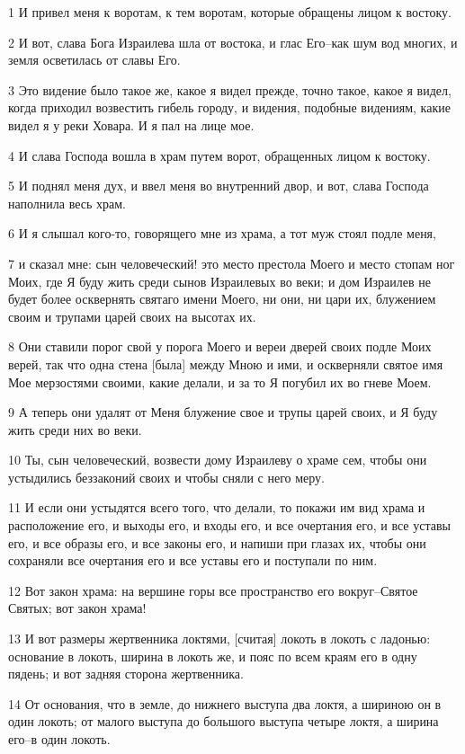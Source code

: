 \par 1 И привел меня к воротам, к тем воротам, которые обращены лицом к востоку.
\par 2 И вот, слава Бога Израилева шла от востока, и глас Его--как шум вод многих, и земля осветилась от славы Его.
\par 3 Это видение было такое же, какое я видел прежде, точно такое, какое я видел, когда приходил возвестить гибель городу, и видения, подобные видениям, какие видел я у реки Ховара. И я пал на лице мое.
\par 4 И слава Господа вошла в храм путем ворот, обращенных лицом к востоку.
\par 5 И поднял меня дух, и ввел меня во внутренний двор, и вот, слава Господа наполнила весь храм.
\par 6 И я слышал кого-то, говорящего мне из храма, а тот муж стоял подле меня,
\par 7 и сказал мне: сын человеческий! это место престола Моего и место стопам ног Моих, где Я буду жить среди сынов Израилевых во веки; и дом Израилев не будет более осквернять святаго имени Моего, ни они, ни цари их, блужением своим и трупами царей своих на высотах их.
\par 8 Они ставили порог свой у порога Моего и вереи дверей своих подле Моих верей, так что одна стена [была] между Мною и ими, и оскверняли святое имя Мое мерзостями своими, какие делали, и за то Я погубил их во гневе Моем.
\par 9 А теперь они удалят от Меня блужение свое и трупы царей своих, и Я буду жить среди них во веки.
\par 10 Ты, сын человеческий, возвести дому Израилеву о храме сем, чтобы они устыдились беззаконий своих и чтобы сняли с него меру.
\par 11 И если они устыдятся всего того, что делали, то покажи им вид храма и расположение его, и выходы его, и входы его, и все очертания его, и все уставы его, и все образы его, и все законы его, и напиши при глазах их, чтобы они сохраняли все очертания его и все уставы его и поступали по ним.
\par 12 Вот закон храма: на вершине горы все пространство его вокруг--Святое Святых; вот закон храма!
\par 13 И вот размеры жертвенника локтями, [считая] локоть в локоть с ладонью: основание в локоть, ширина в локоть же, и пояс по всем краям его в одну пядень; и вот задняя сторона жертвенника.
\par 14 От основания, что в земле, до нижнего выступа два локтя, а шириною он в один локоть; от малого выступа до большого выступа четыре локтя, а ширина его--в один локоть.
